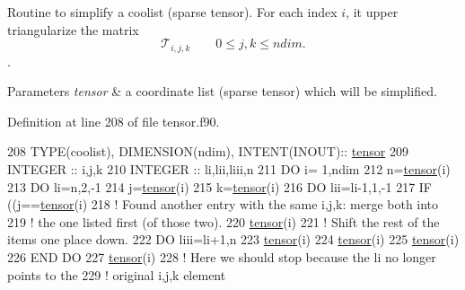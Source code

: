 Routine to simplify a coolist (sparse tensor). For each index $i$, it upper triangularize the matrix \[\mathcal{T}_{i,j,k} \qquad 0 \leq j,k \leq ndim.\]. 


\begin{DoxyParams}{Parameters}
{\em tensor} & a coordinate list (sparse tensor) which will be simplified. \\
\hline
\end{DoxyParams}


Definition at line 208 of file tensor.\+f90.


\begin{DoxyCode}
208    \textcolor{keywordtype}{TYPE}(coolist), \textcolor{keywordtype}{DIMENSION(ndim)}, \textcolor{keywordtype}{INTENT(INOUT)}:: \hyperlink{namespacetensor}{tensor}
209    \textcolor{keywordtype}{INTEGER} :: i,j,k
210    \textcolor{keywordtype}{INTEGER} :: li,lii,liii,n
211    \textcolor{keywordflow}{DO} i= 1,ndim
212       n=\hyperlink{namespacetensor}{tensor}(i)%
213       \textcolor{keywordflow}{DO} li=n,2,-1
214          j=\hyperlink{namespacetensor}{tensor}(i)%
215          k=\hyperlink{namespacetensor}{tensor}(i)%
216          \textcolor{keywordflow}{DO} lii=li-1,1,-1
217             \textcolor{keywordflow}{IF} ((j==\hyperlink{namespacetensor}{tensor}(i)%
218                \textcolor{comment}{! Found another entry with the same i,j,k: merge both into}
219                \textcolor{comment}{! the one listed first (of those two). }
220                \hyperlink{namespacetensor}{tensor}(i)%
221                \textcolor{comment}{! Shift the rest of the items one place down.}
222                \textcolor{keywordflow}{DO} liii=li+1,n
223                   \hyperlink{namespacetensor}{tensor}(i)%
224                   \hyperlink{namespacetensor}{tensor}(i)%
225                   \hyperlink{namespacetensor}{tensor}(i)%
226 \textcolor{keywordflow}{               END DO}
227                \hyperlink{namespacetensor}{tensor}(i)%
228                \textcolor{comment}{! Here we should stop because the li no longer points to the}
229                \textcolor{comment}{! original i,j,k element}

\end{DoxyCode}
